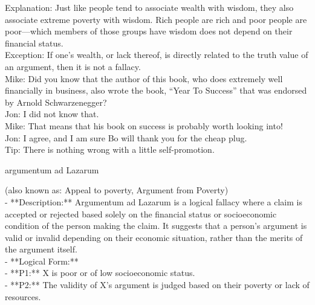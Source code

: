 \documentclass[a4paper,12pt,single,pdftex]{scrartcl}
\begin{document}
{    
      Explanation: Just like people tend to associate wealth with wisdom, they also associate extreme poverty with wisdom.  Rich people are rich and poor people are poor—which members of those groups have wisdom does not depend on their financial status.
    \\

    
      Exception: If one’s wealth, or lack thereof, is directly related to the truth value of an argument, then it is not a fallacy.
    \\

    
      Mike: Did you know that the author of this book, who does extremely well financially in business, also wrote the book, “Year To Success” that was endorsed by Arnold Schwarzenegger?
    \\

    
      Jon: I did not know that.
    \\

    
      Mike: That means that his book on success is probably worth looking into!
    \\

    
      Jon: I agree, and I am sure Bo will thank you for the cheap plug.
    \\

    
      Tip: There is nothing wrong with a little self-promotion.
    \\

  }


argumentum ad Lazarum
    
      (also known as: Appeal to poverty, Argument from Poverty)
    \\

  
    
      - **Description:** Argumentum ad Lazarum is a logical fallacy where a claim is accepted or rejected based solely on the financial status or socioeconomic condition of the person making the claim. It suggests that a person's argument is valid or invalid depending on their economic situation, rather than the merits of the argument itself.
    \\

    
      - **Logical Form:**
    \\

    
        - **P1:** X is poor or of low socioeconomic status.
    \\

    
        - **P2:** The validity of X's argument is judged based on their poverty or lack of resources.
    \\
\end{document}
